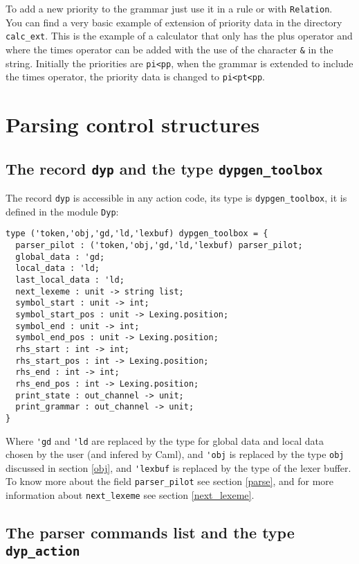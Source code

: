 \documentclass[12pt]{article}
\begin{document}
{To add a new priority to the grammar just use it in a rule or with \verb|Relation|.\\

You can find a very basic example of extension of priority data in the directory \verb|calc_ext|. This is the example of a calculator that only has the plus operator and where the times operator can be added with the use of the character \verb|&| in the string. Initially the priorities are \verb|pi<pp|, when the grammar is extended to include the times operator, the priority data is changed to \verb|pi<pt<pp|.

\section{Parsing control structures}

\subsection{The record \texttt{dyp} and the type \texttt{dypgen\_toolbox}}\label{dyp}

The record \verb|dyp| is accessible in any action code, its type is \verb|dypgen_toolbox|, it is defined in the module \verb|Dyp|:
\begin{verbatim}
type ('token,'obj,'gd,'ld,'lexbuf) dypgen_toolbox = {
  parser_pilot : ('token,'obj,'gd,'ld,'lexbuf) parser_pilot;
  global_data : 'gd;
  local_data : 'ld;
  last_local_data : 'ld;
  next_lexeme : unit -> string list;
  symbol_start : unit -> int;
  symbol_start_pos : unit -> Lexing.position;
  symbol_end : unit -> int;
  symbol_end_pos : unit -> Lexing.position;
  rhs_start : int -> int;
  rhs_start_pos : int -> Lexing.position;
  rhs_end : int -> int;
  rhs_end_pos : int -> Lexing.position;
  print_state : out_channel -> unit;
  print_grammar : out_channel -> unit;
}
\end{verbatim}
Where \verb|'gd| and \verb|'ld| are replaced by the type for global data and local data chosen by the user (and infered by Caml), and \verb|'obj| is replaced by the type \verb|obj| discussed in section \ref{obj}, and \verb|'lexbuf| is replaced by the type of the lexer buffer. To know more about the field \verb|parser_pilot| see section \ref{parse}, and for more information about \verb|next_lexeme| see section \ref{next_lexeme}.

\subsection{The parser commands list and the type \texttt{dyp\_action}}\label{dyp_action}

}
\end{document}
